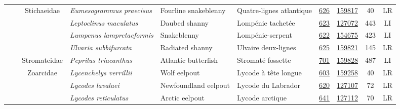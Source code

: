 \documentclass[12pt]{article}\usepackage[]{graphicx}\usepackage[]{color}
\begin{document}
\begin{landscapepage}
\begin{longtable}[t]{ccc>{\centering\arraybackslash}p{3cm}>{\centering\arraybackslash}p{3cm}>{\centering\arraybackslash}p{3cm}>{}c>{}ccc}
\hspace{1em}\hspace{1em} &  & Stichaeidae & \em{Eumesogrammus praecisus} & Fourline snakeblenny & Quatre-lignes atlantique & \href{#sec:626}{626} & \href{http://www.marinespecies.org/aphia.php?p=taxdetails&id=159817}{159817} & 40 & LR\\
\hspace{1em}\hspace{1em} &  &  & \em{Leptoclinus maculatus} & Daubed shanny & Lompénie tachetée & \href{#sec:623}{623} & \href{http://www.marinespecies.org/aphia.php?p=taxdetails&id=127072}{127072} & 443 & LI\\
\hspace{1em}\hspace{1em} &  &  & \em{Lumpenus lampretaeformis} & Snakeblenny & Lompénie-serpent & \href{#sec:622}{622} & \href{http://www.marinespecies.org/aphia.php?p=taxdetails&id=154675}{154675} & 423 & LI\\
\hspace{1em}\hspace{1em} &  &  & \em{Ulvaria subbifurcata} & Radiated shanny & Ulvaire deux-lignes & \href{#sec:625}{625} & \href{http://www.marinespecies.org/aphia.php?p=taxdetails&id=159821}{159821} & 145 & LR\\
\hspace{1em}\hspace{1em} &  & Stromateidae & \em{Peprilus triacanthus} & Atlantic butterfish & Stromaté fossette & \href{#sec:701}{701} & \href{http://www.marinespecies.org/aphia.php?p=taxdetails&id=159828}{159828} & 487 & LI\\
\hspace{1em}\hspace{1em} &  & Zoarcidae & \em{Lycenchelys verrillii} & Wolf eelpout & Lycode à tête longue & \href{#sec:603}{603} & \href{http://www.marinespecies.org/aphia.php?p=taxdetails&id=159258}{159258} & 40 & LR\\
\hspace{1em}\hspace{1em} &  &  & \em{Lycodes lavalaei} & Newfoundland eelpout & Lycode du Labrador & \href{#sec:620}{620} & \href{http://www.marinespecies.org/aphia.php?p=taxdetails&id=127107}{127107} & 72 & LR\\
\hspace{1em}\hspace{1em} &  &  & \em{Lycodes reticulatus} & Arctic eelpout & Lycode arctique & \href{#sec:641}{641} & \href{http://www.marinespecies.org/aphia.php?p=taxdetails&id=127112}{127112} & 70 & LR\\

\end{longtable}
\end{landscapepage}
\end{document}
